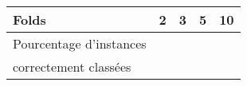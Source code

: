 
\begin{table}[h]
\begin{tabular}{p{5cm}|p{2cm}|p{2cm}|p{2cm}|p{2cm}}
Folds			&2	&3	&5	&10 \\
\hline
Pourcentage d'instances	&	&	&	&\\
 correctement classées
\end{tabular}
\end{table}

